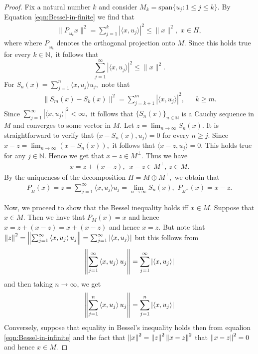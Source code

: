 \begin{proof}
    Fix a natural number $k$ and consider $M_k= \text{span} \{u_j: 1\leqslant j \leqslant k\}.$ By Equation \ref{eqn:Bessel-in-finite} we find that 
\begin{align*}
\|P_{_{M_k}}x\|^2 = \sum_{j=1}^k |\langle x, u_j\rangle|^2 \leqslant \|x\|^2,\,\,x\in H,
\end{align*}
where where $P_{_{M_k}}$ denotes the orthogonal projection onto $M.$ Since this holds true for every $k\in \mathbb N,$ it follows that
$$ \sum_{j=1}^{\infty} |\langle x, u_j\rangle|^2 \leqslant \|x\|^2.$$ 
For $S_n(x) = \sum_{j=1}^{n} \langle x, u_j\rangle u_j ,$  note that 
\begin{align*}
\|S_m(x) - S_k(x)\|^2= \sum_{j=k+1}^m |\langle x, u_j\rangle|^2,\,\, \,\,~~~~k\geqslant m.
\end{align*}
Since $\sum_{j=1}^{\infty} |\langle x, u_j\rangle|^2 < \infty ,$ it follows that $\{S_n(x)\}_{n\in\mathbb N}$ is a Cauchy sequence in $M$ and converges to some vector in $M.$ Let $z= \lim_{n\to\infty} S_n(x).$ It is straightforward to verify that $\langle x-S_n(x), u_j\rangle = 0$ for every $n\geqslant j.$ Since $x-z= \lim_{n\to\infty} (x-S_n(x)),$ it follows that $\langle x-z,u_j\rangle =0.$ This holds true for any $j\in \mathbb N.$ Hence 
we get that $x-z\in M^{\perp}.$ Thus we have
\begin{align*}
x= z+ (x-z) ,\,\,\,x-z\in M^{\perp},\,z\in M.
\end{align*}
By the uniqueness of the decomposition $H= M \oplus M^{\perp},$ we obtain that 
\begin{align*}
P_{_M}(x)= z= \sum_{j=1}^{\infty} \langle x, u_j\rangle u_j = \lim_{n\to\infty} S_n(x),\,\, P_{{_M}^{\perp}}(x)=x-z.
\end{align*}

Now, we proceed to show that the Bessel inequality holds iff $x\in M$. Suppose that $x\in M$. Then we have that $P_{M} \left( x \right) = x$ and hence $x = z + (x-z) = x + (x-z)$ and hence $x=z$. But note that $\left\lVert z \right\rVert ^{2} = \left\lVert \sum_{j=1}^{\infty}\left\langle x, u_{j} \right\rangle u_{j} \right\rVert = \sum_{j=1}^{\infty} \left\lvert \left\langle x,u_{j} \right\rangle \right\rvert$ but this follows from 
\begin{align*}
    \left\lVert \sum_{j=1}^{\infty}\left\langle x, u_{j} \right\rangle u_{j} \right\rVert = \sum_{j=1}^{\infty} \left\lvert \left\langle x,u_{j} \right\rangle  \right\rvert
\end{align*} and then taking $n\to \infty$, we get
\begin{align}
    \left\lVert \sum_{j=1}^{n}\left\langle x, u_{j} \right\rangle u_{j} \right\rVert = \sum_{j=1}^{n} \left\lvert \left\langle x,u_{j} \right\rangle \right\rvert  \label{eqn:Bessel-in-infinite}
\end{align}
Conversely, suppose that equality in Bessel's inequality holds then from equalion \ref{eqn:Bessel-in-infinite} and the fact that $\left\lVert x \right\rVert ^{2} = \left\lVert z \right\rVert ^{2} \left\lVert x-z \right\rVert ^{2}$ that $\left\lVert x-z \right\rVert ^{2} = 0$ and hence $x\in M$.
\end{proof}

